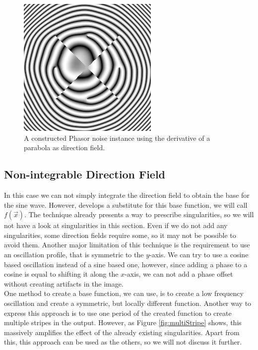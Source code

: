 \documentclass{utue} %
\begin{document}
\begin{figure}[ht]
  \centering
  \includegraphics[width=0.45\linewidth]{images/paraboloidDir}
  \caption{A constructed Phasor noise instance using the derivative of a parabola as direction field.}\label{fig:parabola}
\end{figure}

\subsection{Non-integrable Direction Field}\label{sec:stripes}
In this case we can not simply integrate the direction field to obtain the base for the sine wave. However, \cite{stripes} develops a substitute for this base function, we will call $f(\vec{x})$. The technique already presents a way to prescribe singularities, so we will not have a look at singularities in this section. Even if we do not add any singularities, some direction fields require some, so it may not be possible to avoid them. Another major limitation of this technique is the requirement to use an oscillation profile, that is symmetric to the $y$-axis. We can try to use a cosine based oscillation instead of a sine based one, however, since adding a phase to a cosine is equal to shifting it along the $x$-axis, we can not add a phase offset without creating artifacts in the image.\\
One method to create a base function, we can use, is to create a low frequency oscillation and create a symmetric, but locally different function. Another way to express this approach is to use one period of the created function to create multiple stripes in the output. However, as Figure \ref{fig:multiStripe} shows, this massively amplifies the effect of the already existing singularities. Apart from this, this approach can be used as the others, so we will not discuss it further.
\end{document}

